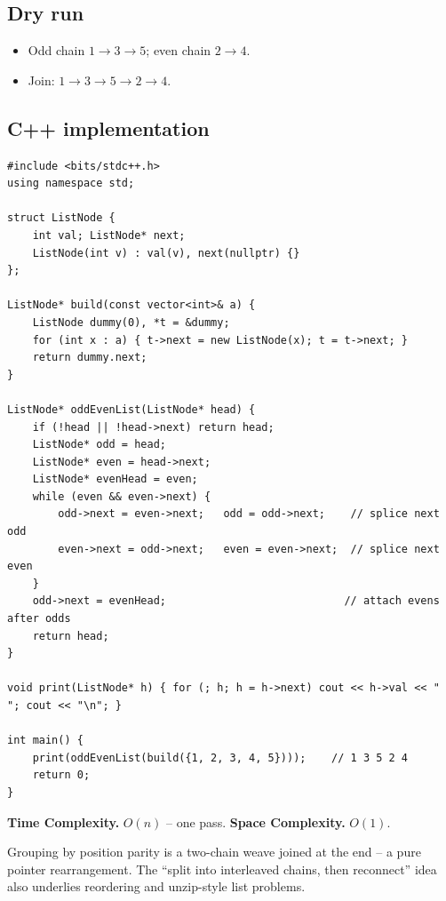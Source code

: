 \subsection*{Dry run}


\begin{itemize}
  \item Odd chain $1\to3\to5$; even chain $2\to4$.
  \item Join: $1\to3\to5\to2\to4$.
\end{itemize}

\subsection*{C++ implementation}

\begin{lstlisting}
#include <bits/stdc++.h>
using namespace std;

struct ListNode {
    int val; ListNode* next;
    ListNode(int v) : val(v), next(nullptr) {}
};

ListNode* build(const vector<int>& a) {
    ListNode dummy(0), *t = &dummy;
    for (int x : a) { t->next = new ListNode(x); t = t->next; }
    return dummy.next;
}

ListNode* oddEvenList(ListNode* head) {
    if (!head || !head->next) return head;
    ListNode* odd = head;
    ListNode* even = head->next;
    ListNode* evenHead = even;
    while (even && even->next) {
        odd->next = even->next;   odd = odd->next;    // splice next odd
        even->next = odd->next;   even = even->next;  // splice next even
    }
    odd->next = evenHead;                            // attach evens after odds
    return head;
}

void print(ListNode* h) { for (; h; h = h->next) cout << h->val << " "; cout << "\n"; }

int main() {
    print(oddEvenList(build({1, 2, 3, 4, 5})));    // 1 3 5 2 4
    return 0;
}
\end{lstlisting}

\begin{complexitybox}
\textbf{Time Complexity.} $O(n)$ -- one pass. \textbf{Space Complexity.}
$O(1)$.
\end{complexitybox}

\begin{takeawaybox}
Grouping by position parity is a two-chain weave joined at the end -- a
pure pointer rearrangement. The ``split into interleaved chains, then
reconnect'' idea also underlies reordering and unzip-style list problems.
\end{takeawaybox}
